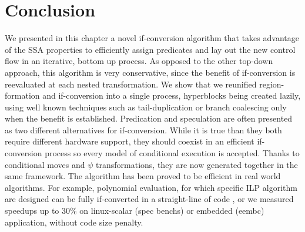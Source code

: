 \section{Conclusion} 
We presented in this chapter a novel if-conversion algorithm that takes advantage of the SSA properties to efficiently assign predicates and lay out the new control flow in an iterative, bottom up process. As opposed to the other top-down approach, this algorithm is very conservative, since the benefit of if-conversion is reevaluated at each nested transformation.
We show that we reunified region-formation and if-conversion into a single process, hyperblocks being created lazily, using well known techniques such as tail-duplication or branch coalescing only when the benefit is established.
Predication and speculation are often presented as two different alternatives for if-conversion. While it is true than they both require different hardware support, they should coexist in an efficient if-conversion process so every model of conditional execution is accepted. Thanks to conditional moves and $\psi$ transformations, they are now generated together in the same framework. The algorithm has been proved to be efficient in real world algorithms. For example, polynomial evaluation, for which specific ILP algorithm are designed can be fully if-converted in a straight-line of code \cite{JeKnMoRe11}, or we measured speedups up to 30\% on linux-scalar (spec benchs) or embedded (eembc) application, without code size penalty.





